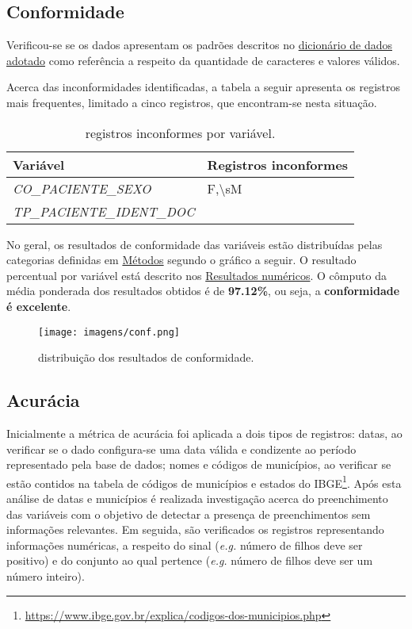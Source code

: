 \documentclass[
  12,
  table]{proadi}
\begin{document}
\hypertarget{conformidade}{%
\subsection{Conformidade}\label{conformidade}}

Verificou-se se os dados apresentam os padrões descritos no
\protect\hyperlink{dicionuxe1rio-adotado}{dicionário de dados adotado}
como referência a respeito da quantidade de caracteres e valores
válidos.

Acerca das inconformidades identificadas, a tabela a seguir apresenta os
registros mais frequentes, limitado a cinco registros, que encontram-se
nesta situação.

\begingroup\fontsize{10}{12}\selectfont

\begin{longtable}[t]{>{}l>{\raggedright\arraybackslash}p{10cm}}
\caption{\label{tab:unnamed-chunk-13}registros inconformes por variável.}\\
\toprule
Variável & Registros inconformes\\
\midrule
\em{CO\_PACIENTE\_SEXO} & F,\textbackslash{}sM\\
\em{TP\_PACIENTE\_IDENT\_DOC} & 6\\
\bottomrule
\end{longtable}
\endgroup{}

No geral, os resultados de conformidade das variáveis estão distribuídas
pelas categorias definidas em \protect\hyperlink{muxe9todos}{Métodos}
segundo o gráfico a seguir. O resultado percentual por variável está
descrito nos \protect\hyperlink{resultados-numuxe9ricos}{Resultados
numéricos}. O cômputo da média ponderada dos resultados obtidos é de
\textbf{97.12\%}, ou seja, a \textbf{conformidade é excelente}.

\begin{figure}
\centering
\texttt{[image: imagens/conf.png]}
\caption{distribuição dos resultados de conformidade.}
\end{figure}

\hypertarget{acuruxe1cia}{%
\subsection{Acurácia}\label{acuruxe1cia}}

Inicialmente a métrica de acurácia foi aplicada a dois tipos de
registros: datas, ao verificar se o dado configura-se uma data válida e
condizente ao período representado pela base de dados; nomes e códigos
de municípios, ao verificar se estão contidos na tabela de códigos de
municípios e estados do IBGE\footnote{\url{https://www.ibge.gov.br/explica/codigos-dos-municipios.php}}.
Após esta análise de datas e municípios é realizada investigação acerca
do preenchimento das variáveis com o objetivo de detectar a presença de
preenchimentos sem informações relevantes. Em seguida, são verificados
os registros representando informações numéricas, a respeito do sinal
(\emph{e.g.} número de filhos deve ser positivo) e do conjunto ao qual
pertence (\emph{e.g.} número de filhos deve ser um número inteiro).
\end{document}

